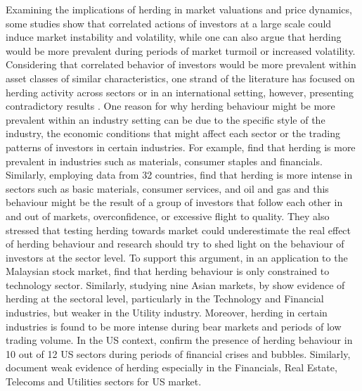 \documentclass[
  letterpaper,
  DIV=11,
  numbers=noendperiod]{scrartcl}
\begin{document}
Examining the implications of herding in market valuations and price
dynamics, some studies show that correlated actions of investors at a
large scale could induce market instability and volatility, while one
can also argue that herding would be more prevalent during periods of
market turmoil or increased volatility. Considering that correlated
behavior of investors would be more prevalent within asset classes of
similar characteristics, one strand of the literature has focused on
herding activity across sectors or in an international setting, however,
presenting contradictory results \citep[see
\emph{interalia}][]{christie1995following, choi2009institutional, litimi2016herding}.
One reason for why herding behaviour might be more prevalent within an
industry setting can be due to the specific style of the industry, the
economic conditions that might affect each sector or the trading
patterns of investors in certain industries. For example,
\citet{henker2006investors} find that herding is more prevalent in
industries such as materials, consumer staples and financials.
Similarly, employing data from 32 countries,
\citet{gkebka2013international} find that herding is more intense in
sectors such as basic materials, consumer services, and oil and gas and
this behaviour might be the result of a group of investors that follow
each other in and out of markets, overconfidence, or excessive flight to
quality. They also stressed that testing herding towards market could
underestimate the real effect of herding behaviour and research should
try to shed light on the behaviour of investors at the sector level. To
support this argument, in an application to the Malaysian stock market,
\citet{dehghani2014sectoral} find that herding behaviour is only
constrained to technology sector. Similarly, studying nine Asian
markets, by \citet{zheng2017herding} show evidence of herding at the
sectoral level, particularly in the Technology and Financial industries,
but weaker in the Utility industry. Moreover, herding in certain
industries is found to be more intense during bear markets and periods
of low trading volume. In the US context, \citet{bensaida2017herding}
confirm the presence of herding behaviour in 10 out of 12 US sectors
during periods of financial crises and bubbles. Similarly,
\citet{ukpong2021determinants} document weak evidence of herding
especially in the Financials, Real Estate, Telecoms and Utilities
sectors for US market.
\end{document}
